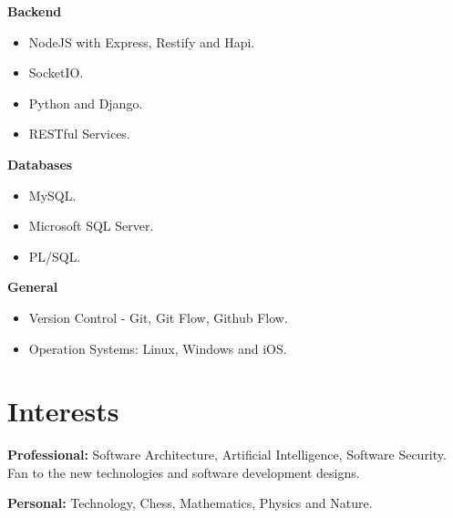 \documentclass[]{friggeri-cv} %
\begin{document}
\textbf{Backend}
\begin{itemize}
	\item NodeJS with Express, Restify and Hapi.
	\item SocketIO.
	\item Python and Django.
	\item RESTful Services.
\end{itemize}

\textbf{Databases}
\begin{itemize}
	\item MySQL.
	\item Microsoft SQL Server.
	\item PL/SQL.
\end{itemize}

\textbf{General}
\begin{itemize}
	\item Version Control - Git, Git Flow, Github Flow.
	\item Operation Systems: Linux, Windows and iOS.
\end{itemize}


\section{Interests}

\textbf{Professional:} Software Architecture, Artificial Intelligence, Software Security. Fan to the new technologies and software development designs.

\textbf{Personal:} Technology, Chess, Mathematics, Physics and Nature.
\end{document}
